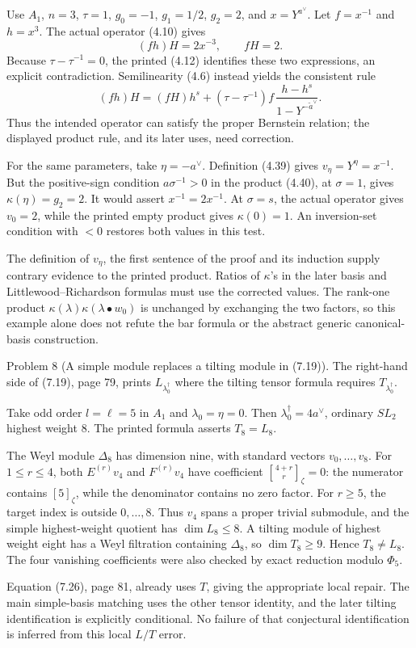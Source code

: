\documentclass[10pt]{article}
\begin{document}
Use \(A_1\), \(n=3\), \(\tau=1\), \(g_0=-1\), \(g_1=1/2\), \(g_2=2\), and \(x=Y^{a^\vee}\). Let \(f=x^{-1}\) and \(h=x^3\). The actual operator (4.10) gives \[(fh)H=2x^{-3},\qquad fH=2.\] Because \(\tau-\tau^{-1}=0\), the printed (4.12) identifies these two expressions, an explicit contradiction. Semilinearity (4.6) instead yields the consistent rule \[(fh)H=(fH)h^s+
 (\tau-\tau^{-1})f\,\frac{h-h^s}{1-Y^{-\widetilde a^\vee}}.\] Thus the intended operator can satisfy the proper Bernstein relation; the displayed product rule, and its later uses, need correction.\par
For the same parameters, take \(\eta=-a^\vee\). Definition (4.39) gives \(v_\eta=Y^\eta=x^{-1}\). But the positive-sign condition \(a\sigma^{-1}>0\) in the product (4.40), at \(\sigma=1\), gives \(\kappa(\eta)=g_2=2\). It would assert \(x^{-1}=2x^{-1}\). At \(\sigma=s\), the actual operator gives \(v_0=2\), while the printed empty product gives \(\kappa(0)=1\). An inversion-set condition with \(<0\) restores both values in this test.\par
The definition of \(v_\eta\), the first sentence of the proof and its induction supply contrary evidence to the printed product. Ratios of \(\kappa\)’s in the later basis and Littlewood–Richardson formulas must use the corrected values. The rank-one product \(\kappa(\lambda)\kappa(\lambda\bullet w_0)\) is unchanged by exchanging the two factors, so this example alone does not refute the bar formula or the abstract generic canonical-basis construction.\par
Problem 8 (A simple module replaces a tilting module in (7.19)).  The right-hand side of (7.19), page 79, prints \(L_{\lambda_0^\dagger}\) where the tilting tensor formula requires \(T_{\lambda_0^\dagger}\).\par
Take odd order \(l=\ell=5\) in \(A_1\) and \(\lambda_0=\eta=0\). Then \(\lambda_0^\dagger=4a^\vee\), ordinary \(SL_2\) highest weight \(8\). The printed formula asserts \(T_8=L_8\).\par
The Weyl module \(\Delta_8\) has dimension nine, with standard vectors \(v_0,\ldots,v_8\). For \(1\le r\le4\), both \(E^{(r)}v_4\) and \(F^{(r)}v_4\) have coefficient \({4+r\brack r}_\zeta=0\): the numerator contains \([5]_\zeta\), while the denominator contains no zero factor. For \(r\ge5\), the target index is outside \(0,\ldots,8\). Thus \(v_4\) spans a proper trivial submodule, and the simple highest-weight quotient has \(\dim L_8\le8\). A tilting module of highest weight eight has a Weyl filtration containing \(\Delta_8\), so \(\dim T_8\ge9\). Hence \(T_8\ne L_8\). The four vanishing coefficients were also checked by exact reduction modulo \(\Phi_5\).\par
Equation (7.26), page 81, already uses \(T\), giving the appropriate local repair. The main simple-basis matching uses the other tensor identity, and the later tilting identification is explicitly conditional. No failure of that conjectural identification is inferred from this local \(L/T\) error.\par
\end{document}
